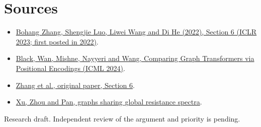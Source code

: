 \documentclass[10pt]{article}
\begin{document}
\section*{Sources}
\begin{itemize}
\item \href{https://openreview.net/forum?id=r9hNv76KoT3}{Bohang Zhang, Shengjie Luo, Liwei Wang and Di He (2022), Section 6 (ICLR 2023; first posted in 2022)}.
\item \href{https://proceedings.mlr.press/v235/black24b.html}{Black, Wan, Mishne, Nayyeri and Wang, Comparing Graph Transformers via Positional Encodings (ICML 2024)}.
\item \href{https://arxiv.org/abs/2301.09505}{Zhang et al., original paper, Section 6}.
\item \href{https://arxiv.org/abs/2403.06096}{Xu, Zhou and Pan, graphs sharing global resistance spectra}.
\end{itemize}
{\small Research draft. Independent review of the argument and priority is pending.}
\end{document}
